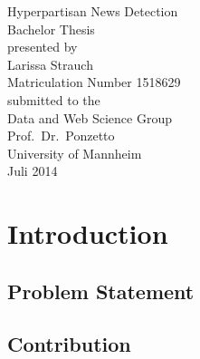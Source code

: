 \documentclass[11pt,titlepage,oneside,openany]{book}
\begin{document}
\begin{titlepage}
	\vspace*{2cm}
  \begin{center}
   {\Large Hyperpartisan News Detection\\}
   \vspace{2cm} 
   {Bachelor Thesis\\}
   \vspace{2cm}
   {presented by\\
    Larissa Strauch \\
    Matriculation Number 1518629\\
   }
   \vspace{1cm} 
   {submitted to the\\
    Data and Web Science Group\\
    Prof.\ Dr.\ Ponzetto\\
    University of Mannheim\\} \vspace{2cm}
   {Juli 2014}
  \end{center}
\end{titlepage} 

\tableofcontents
\newpage

\listofalgorithms

\listoffigures

\listoftables


\newpage



\chapter{Introduction}

\section{Problem Statement}
 
 

\section{Contribution}

 
\end{document}
